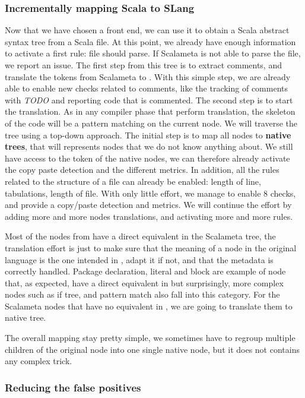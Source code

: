 \subsubsection{Incrementally mapping Scala to SLang}
\label{subsubsec:scala_to_slang}
Now that we have chosen a front end, we can use it to obtain a Scala abstract syntax tree from a Scala file. 
At this point, we already have enough information to activate a first rule: file should parse.
If Scalameta is not able to parse the file, we report an issue.
The first step from this tree is to extract comments, and translate the tokens from Scalameta to \slang{}.
With this simple step, we are already able to enable new checks related to comments, like the tracking of comments with \emph{TODO} and reporting code that is commented.
The second step is to start the translation. 
As in any compiler phase that perform translation, the skeleton of the code will be a pattern matching on the current node. 
We will traverse the tree using a top-down approach. 
The initial step is to map all nodes to \textbf{native trees}, that will represents nodes that we do not know anything about. 
We still have access to the token of the native nodes, we can therefore already activate the copy paste detection and the different metrics. 
In addition, all the rules related to the structure of a file can already be enabled: length of line, tabulations, length of file.
With only little effort, we manage to enable 8 checks, and provide a copy/paste detection and metrics. 
We will continue the effort by adding more and more nodes translations, and activating more and more rules.

Most of the nodes from \slang{} have a direct equivalent in the Scalameta tree, the translation effort is just to make sure that the meaning of a node in
the original language is the one intended in \slang{}, adapt it if not, and that the metadata is correctly handled. Package declaration, literal and block are example of node that, as expected, have a direct equivalent in \slang{} but surprisingly, more complex nodes such as if tree, and pattern match also fall into this category. 
For the Scalameta nodes that have no equivalent in
\slang{}, we are going to translate them to native tree.

The overall mapping stay pretty simple, we sometimes have to regroup
multiple children of the original node into one single native node, but it does
not contains any complex trick.

\subsubsection{Reducing the false positives}
\label{subsubsec:reducing_false_positives}

